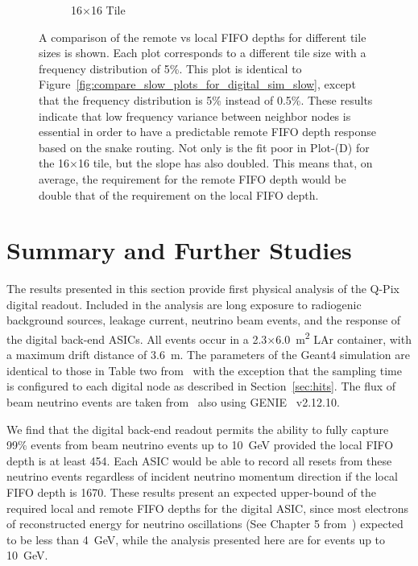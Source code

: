 \begin{figure}
\begin{subfigure}[b]{0.475\textwidth}
      \caption[]%
      {\small 16$\times$16 Tile}    
  \end{subfigure}
  \caption[]
  {\small A comparison of the remote vs local FIFO depths for different tile sizes is shown.
  Each plot corresponds to a different tile size with a frequency distribution of 5\%.
  This plot is identical to Figure~\ref{fig:compare_slow_plots_for_digital_sim_slow}, except that the frequency distribution is 5\% instead of 0.5\%.
  These results indicate that low frequency variance between neighbor nodes is essential in order to have a predictable remote FIFO depth response based on the snake routing.
  Not only is the fit poor in Plot-(D) for the 16$\times$16 tile, but the slope has also doubled.
  This means that, on average, the requirement for the remote FIFO depth would be double that of the requirement on the local FIFO depth.
} 
  \label{fig:compare_fast_plots_for_digital_sim_fast}
\end{figure}







\section{Summary and Further Studies}\label{sec:further_studies}
The results presented in this section provide first physical analysis of the Q-Pix digital readout.
Included in the analysis are long exposure to radiogenic background sources, leakage current, neutrino beam events, and the response of the digital back-end ASICs.
All events occur in a 2.3$\times$6.0~\unit{m^{2}} LAr container, with a maximum drift distance of 3.6~\unit{m}.
The parameters of the Geant4 simulation are identical to those in Table two from~\citep{qpix:shion} with the exception that the sampling time is configured to each digital node as described in Section~\ref{sec:hits}.
The flux of beam neutrino events are taken from~\citep{dune_2021_near_detector_cdr} also using GENIE~\citep{Andreopoulos:2009rq} v2.12.10.

We find that the digital back-end readout permits the ability to fully capture 99\% events from beam neutrino events up to 10~\unit{GeV} provided the local FIFO depth is at least 454.
Each ASIC would be able to record all resets from these neutrino events regardless of incident neutrino momentum direction if the local FIFO depth is 1670.
These results present an expected upper-bound of the required local and remote FIFO depths for the digital ASIC, since most electrons of reconstructed energy for neutrino oscillations (See Chapter 5 from~\citep{DUNE_TDRv3_Abi_2020}) expected to be less than 4~\unit{GeV}, while the analysis presented here are for events up to 10~\unit{GeV}.

